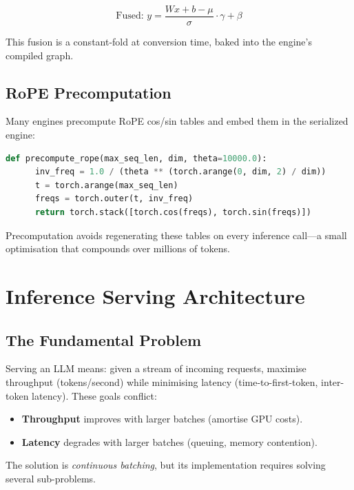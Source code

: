 \documentclass[11pt,a4paper]{article}
\theoremstyle{definition}
\begin{document}
\begin{equation}
	\text{Fused: } y = \frac{Wx + b - \mu}{\sigma} \cdot \gamma + \beta
\end{equation}

This fusion is a constant-fold at conversion time, baked into the engine's compiled graph.

\subsection{RoPE Precomputation}

Many engines precompute RoPE cos/sin tables and embed them in the serialized engine:

\begin{lstlisting}[caption=RoPE table precomputation, language=Python]
  def precompute_rope(max_seq_len, dim, theta=10000.0):
      inv_freq = 1.0 / (theta ** (torch.arange(0, dim, 2) / dim))
      t = torch.arange(max_seq_len)
      freqs = torch.outer(t, inv_freq)
      return torch.stack([torch.cos(freqs), torch.sin(freqs)])
\end{lstlisting}

Precomputation avoids regenerating these tables on every inference call---a small optimisation that compounds over millions of tokens.

\section{Inference Serving Architecture}
\label{sec:serving}

\subsection{The Fundamental Problem}

Serving an LLM means: given a stream of incoming requests, maximise throughput (tokens/second) while minimising latency (time-to-first-token, inter-token latency). These goals conflict:

\begin{itemize}
	\item \textbf{Throughput} improves with larger batches (amortise GPU costs).
	\item \textbf{Latency} degrades with larger batches (queuing, memory contention).
\end{itemize}

The solution is \emph{continuous batching}, but its implementation requires solving several sub-problems.
\end{document}
